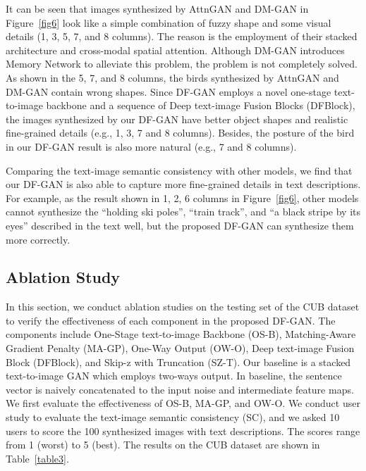 \documentclass[10pt,twocolumn,letterpaper]{article}
\begin{document}
It can be seen that images synthesized by AttnGAN \cite{xu2018attngan} and DM-GAN \cite{zhu2019dm} in Figure~\ref{fig6} look like a simple combination of fuzzy shape and some visual details (1, 3, 5, 7, and 8 columns). 
The reason is the employment of their stacked architecture and cross-modal spatial attention.
Although DM-GAN \cite{zhu2019dm} introduces Memory Network to alleviate this problem, the problem is not completely solved. 
As shown in the 5, 7, and 8 columns, the birds synthesized by AttnGAN \cite{xu2018attngan} and DM-GAN \cite{zhu2019dm} contain wrong shapes. 
Since DF-GAN employs a novel one-stage text-to-image backbone and a sequence of Deep text-image Fusion Blocks (DFBlock), the images synthesized by our DF-GAN have better object shapes and realistic fine-grained details (e.g., 1, 3, 7 and 8 columns). Besides, the posture of the bird in our DF-GAN result is also more natural (e.g., 7 and 8 columns). 

Comparing the text-image semantic consistency with other models, we find that our DF-GAN is also able to capture more fine-grained details in text descriptions.
For example, as the result shown in 1, 2, 6 columns in Figure~\ref{fig6}, other models cannot synthesize the ``holding ski poles'', ``train track'', and ``a black stripe by its eyes'' described in the text well, but the proposed DF-GAN can synthesize them more correctly. 


\subsection{Ablation Study}

In this section, we conduct ablation studies on the testing set of the CUB dataset to verify the effectiveness of each component in the proposed DF-GAN. 
The components include One-Stage text-to-image Backbone (OS-B), Matching-Aware Gradient Penalty (MA-GP), One-Way Output (OW-O), Deep text-image Fusion Block (DFBlock), and Skip-z with Truncation (SZ-T). 
Our baseline is a stacked text-to-image GAN which employs two-ways output. 
In baseline, the sentence vector is naively concatenated to the input noise and intermediate feature maps.
We first evaluate the effectiveness of OS-B, MA-GP, and OW-O. 
We conduct user study to evaluate the text-image semantic consistency (SC), and we asked 10 users to score the 100 synthesized images with text descriptions. 
The scores range from 1 (worst) to 5 (best).
The results on the CUB dataset are shown in Table~\ref{table3}.
\end{document}
